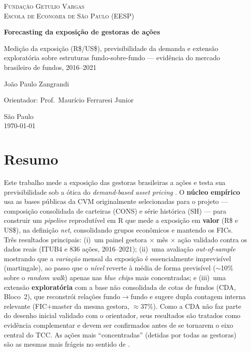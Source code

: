 \documentclass[12pt,a4paper]{report}
\begin{document}
\begin{titlepage}
\centering
\vspace*{1cm}
{\scshape\large Fundação Getulio Vargas \\ Escola de Economia de São Paulo (EESP)\par}
\vspace{2.5cm}
{\huge\bfseries Forecasting da exposição de gestoras de ações\par}
\vspace{0.8cm}
{\Large Medição da exposição (R\$/US\$), previsibilidade da demanda e extensão exploratória sobre estruturas fundo-sobre-fundo --- evidência do mercado brasileiro de fundos, 2016--2021\par}
\vspace{3cm}
{\Large João Paulo Zangrandi\par}
\vspace{0.5cm}
{\large Orientador: Prof.\ Maurício Ferraresi Junior\par}
\vfill
{\large São Paulo \\ \today\par}
\end{titlepage}

\chapter*{Resumo}
Este trabalho mede a exposição das gestoras brasileiras a ações e testa sua previsibilidade sob a ótica do
\emph{demand-based asset pricing} \citep{koijenyogo2019,gabaixkoijen2021}. O \textbf{núcleo empírico} usa as
bases públicas da CVM originalmente selecionadas para o projeto --- composição consolidada de carteiras
(CONS) e série histórica (SH) --- para construir um \emph{pipeline} reprodutível em R que mede a exposição em
\textbf{valor} (R\$ e US\$), na definição \emph{net}, consolidando grupos econômicos e mantendo os FICs.
Três resultados principais: (i)~um painel gestora $\times$ mês $\times$ ação validado contra os dados reais
(ITUB4 e 836 ações, 2016--2021); (ii)~uma avaliação \emph{out-of-sample} mostrando que a \emph{variação}
mensal da exposição é essencialmente imprevisível (martingale), ao passo que o \emph{nível} reverte à média
de forma previsível ($\sim$10\% sobre o \emph{random walk}) apenas nas \emph{blue chips} mais concentradas; e
(iii)~uma extensão \textbf{exploratória} com a base não consolidada de cotas de fundos (CDA, Bloco~2), que
reconstrói relações fundo$\to$fundo e sugere dupla contagem interna relevante (FIC$+$master da mesma gestora,
$\approx 37\%$). Como a CDA não faz parte do desenho inicial validado com o orientador, seus resultados são
tratados como evidência complementar e devem ser confirmados antes de se tornarem o eixo central do TCC. As
ações mais ``concentradas'' (detidas por todas as gestoras) são as mesmas mais frágeis no sentido de
\citet{greenwoodthesmar2011}.
\end{document}
